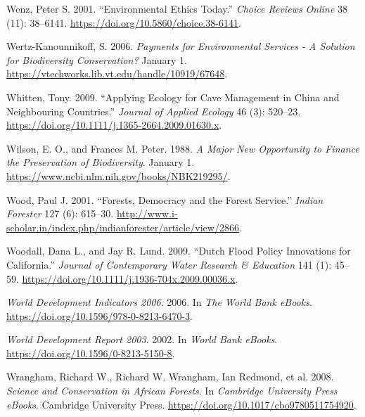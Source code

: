 \begin{CSLReferences}{1}{1}
Wenz, Peter S. 2001. {``Environmental Ethics Today.''} \emph{Choice
Reviews Online} 38 (11): 38--6141.
\url{https://doi.org/10.5860/choice.38-6141}.

Wertz-Kanounnikoff, S. 2006. \emph{Payments for Environmental Services -
A Solution for Biodiversity Conservation?} January 1.
\url{https://vtechworks.lib.vt.edu/handle/10919/67648}.

Whitten, Tony. 2009. {``Applying Ecology for Cave Management in China
and Neighbouring Countries.''} \emph{Journal of Applied Ecology} 46 (3):
520--23. \url{https://doi.org/10.1111/j.1365-2664.2009.01630.x}.

Wilson, E. O., and Frances M. Peter. 1988. \emph{A Major New Opportunity
to Finance the Preservation of Biodiversity}. January 1.
\url{https://www.ncbi.nlm.nih.gov/books/NBK219295/}.

Wood, Paul J. 2001. {``Forests, Democracy and the Forest Service.''}
\emph{Indian Forester} 127 (6): 615--30.
\url{http://www.i-scholar.in/index.php/indianforester/article/view/2866}.

Woodall, Dana L., and Jay R. Lund. 2009. {``Dutch Flood Policy
Innovations for California.''} \emph{Journal of Contemporary Water
Research \& Education} 141 (1): 45--59.
\url{https://doi.org/10.1111/j.1936-704x.2009.00036.x}.

\emph{World Development Indicators 2006}. 2006. In \emph{The World Bank
eBooks}. \url{https://doi.org/10.1596/978-0-8213-6470-3}.

\emph{World Development Report 2003}. 2002. In \emph{World Bank eBooks}.
\url{https://doi.org/10.1596/0-8213-5150-8}.

Wrangham, Richard W., Richard W. Wrangham, Ian Redmond, et al. 2008.
\emph{Science and Conservation in African Forests}. In \emph{Cambridge
University Press eBooks}. Cambridge University Press.
\url{https://doi.org/10.1017/cbo9780511754920}.


\end{CSLReferences}

